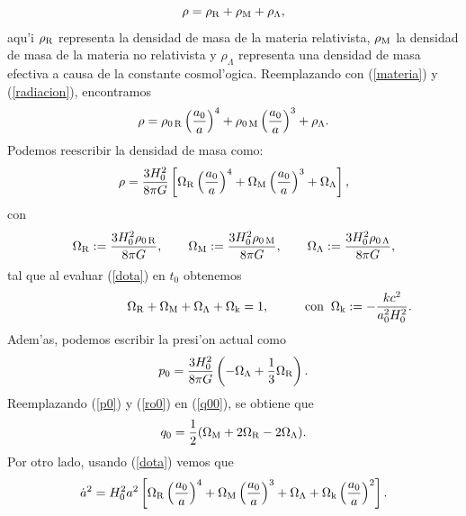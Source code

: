 \begin{equation}
\rho = \rho_{\rm{R}} + \rho_{\rm{M}} + \rho_{\rm{\Lambda}},
\end{equation}
aqu'i $\rho_{\rm{R}}$ representa la densidad de masa de la materia relativista, $\rho_{\rm{M}}$ la densidad de masa de la materia no relativista y $\rho_\Lambda$ representa una densidad de masa efectiva a causa de la constante cosmol'ogica. Reemplazando con (\ref{materia}) y (\ref{radiacion}), encontramos
\begin{equation}
\rho = \rho_{0\,\rm{R}}\left(\frac{a_0}{a}\right)^{4} + \rho_{0\,\rm{M}}\left(\frac{a_0}{a}\right)^{3} + \rho_{\rm{\Lambda}}.
\end{equation}
Podemos reescribir la densidad de masa como:
\begin{equation}
\rho = \frac{3H_0^2}{8\pi G}\left[\Omega_{\rm{R}}\left(\frac{a_0}{a}\right)^{4} + \Omega_{\rm{M}}\left(\frac{a_0}{a}\right)^{3} + \Omega_{\rm{\Lambda}}\right], \label{ro0}
\end{equation}
con
\begin{eqnarray}
\Omega_{\rm{R}} := \frac{3H_0^2\rho_{0\,\rm{R}}}{8\pi G},\qquad 
\Omega_{\rm{M}} := \frac{3H_0^2\rho_{0\,\rm{M}}}{8\pi G}, \qquad
\Omega_{\rm{\Lambda}} := \frac{3H_0^2 \rho_{0\,\rm{\Lambda}}}{8\pi G},
\end{eqnarray}
tal que al evaluar (\ref{dota}) en $t_0$ obtenemos
\begin{equation}
\hspace{2cm} \Omega_{\rm{R}} +\Omega_{\rm{M}} +\Omega_{\rm{\Lambda}} +\Omega_{\rm{k}} =1, \hspace{1cm} \mbox{con} \hspace{0.2cm} \Omega_{\rm{k}} := -\frac{kc^2}{a_0^2H_0^2}. 
\end{equation}
Adem'as, podemos escribir la presi'on actual como
\begin{equation}
p_0=\frac{3H_0^2}{8\pi G}\left( -\Omega_{\rm{\Lambda}}  +\frac{1}{3}\Omega_{\rm{R}} \right). \label{p0}
\end{equation}
Reemplazando (\ref{p0}) y (\ref{ro0}) en (\ref{q00}), se obtiene que
\begin{equation}
q_0=\frac{1}{2}(\Omega_{\rm{M}} + 2\Omega_{\rm{R}}  - 2\Omega_{\rm{\Lambda}}).  \label{q0omega}
\end{equation}
Por otro lado, usando (\ref{dota}) vemos que
\begin{equation}
 \dot a^2 = H_0^2 a^2\left[\Omega_{\rm{R}}\left(\frac{a_0}{a}\right)^{4} + \Omega_{\rm{M}}\left(\frac{a_0}{a}\right)^{3} + \Omega_{\rm{\Lambda}} +\Omega_{\rm{k}}\left(\frac{a_0}{a}\right)^{2} \right]. 
\end{equation}
